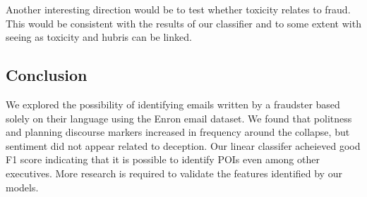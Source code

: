 Another interesting direction would be to test whether toxicity relates to fraud. This would be consistent with the results of our classifier and to some extent with \cite{hubris} seeing as toxicity and hubris can be linked.


\subsection{Conclusion}
We explored the possibility of identifying emails written by a fraudster based solely on their language using the Enron email dataset. We found that politness and planning discourse markers increased in frequency around the collapse, but sentiment did not appear related to deception. Our linear classifer acheieved good F1 score indicating that it is possible to identify POIs even among other executives. More research is required to validate the features identified by our models.


